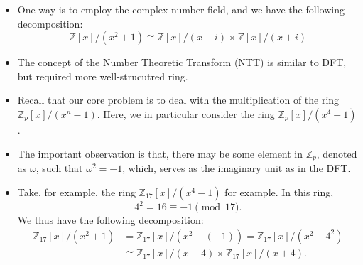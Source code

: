 \begin{frame}
    \begin{itemize}
        \item <1->One way is to employ the complex number field, 
            and we have the following decomposition:
            \[ \mathbb{Z}[x]/(x^2 + 1) \cong 
            \mathbb{Z}[x]/(x - i) \times 
            \mathbb{Z}[x]/(x + i) \]
        \item <2->The concept of the Number Theoretic Transform (NTT) is similar to DFT, 
            but required more well-strucutred ring.
        \item <3->Recall that our core problem is to deal with the multiplication of
            the ring \( \mathbb{Z}_{p}[x]/(x^{n}-1) \).
            Here, we in particular consider the ring \( \mathbb{Z}_{p}[x]/(x^{4}-1) \).
        \item <4->The important observation is that, there may be some element in \( \mathbb{Z}_{p}\),
            denoted as \(\omega\), such that \(\omega^{2} = -1\), which, serves as the imaginary unit
            as in the DFT.

        \item <5->Take, for example, the ring \( \mathbb{Z}_{17}[x]/(x^{4}-1)\) for example. 
            In this ring,
            \[
                4^{2} = 16 \equiv -1 \pmod{17}.
            \]
            We thus have the following decomposition:
            \begin{align*}
                \mathbb{Z}_{17}[x]/(x^{2}+1) 
                &= \mathbb{Z}_{17}[x] / (x^{2} - (-1))
                = \mathbb{Z}_{17}[x] / (x^{2} - 4^{2})\\
                &\cong 
                \mathbb{Z}_{17}[x]/(x-4) \times 
                \mathbb{Z}_{17}[x]/(x+4).
            \end{align*}

    \end{itemize}
\end{frame}





